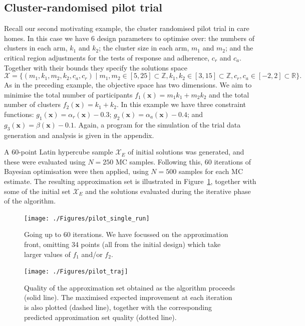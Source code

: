 \documentclass{article} %
\begin{document}
\subsection{Cluster-randomised pilot trial}

Recall our second motivating example, the cluster randomised pilot trial in care homes. In this case we have 6 design parameters to optimise over: the numbers of clusters in each arm, $k_{1}$ and $k_{2}$; the cluster size in each arm, $m_{1}$ and $m_{2}$; and the critical region adjustments for the tests of response and adherence, $c_{r}$ and $c_{a}$. Together with their bounds they specify the solutions space
\begin{equation}
\mathcal{X} = \{ (m_{1}, k_{1}, m_{2}, k_{2}, c_{a}, c_{r}) \mid m_{1}, m_{2} \in [5,25] \subset \mathbb{Z}, k_{1}, k_{2} \in [3,15] \subset \mathbb{Z}, c_{r}, c_{a} \in [-2,2] \subset \mathbb{R} \}.
\end{equation}
As in the preceding example, the objective space has two dimensions. We aim to minimise the total number of participants $f_{1}(\mathbf{x}) = m_{1}k_{1} + m_{2}k_{2}$ and the total number of clusters $f_{2}(\mathbf{x}) = k_{1} + k_{2}$. In this example we have three constraint functions: $g_{1}(\mathbf{x}) = \alpha_{r}(\mathbf{x}) - 0.3$; $g_{2}(\mathbf{x}) = \alpha_{a}(\mathbf{x}) - 0.4$; and $g_{3}(\mathbf{x}) = \beta(\mathbf{x}) - 0.1$. Again, a program for the simulation of the trial data generation and analysis is given in the appendix.

A 60-point Latin hypercube sample $\mathcal{X}_{E}$ of initial solutions was generated, and these were evaluated using $N = 250$ MC samples. Following this, 60 iterations of Bayesian optimisation were then applied, using $N = 500$ samples for each MC estimate. The resulting approximation set is illustrated in Figure~\ref{fig:pilot_single_run}, together with some of the initial set $\mathcal{X}_{E}$ and the solutions evaluated during the iterative phase of the algorithm.

\begin{figure}
\centering
\texttt{[image: ./Figures/pilot\_single\_run]}
\caption{Going up to 60 iterations. We have focussed on the approximation front, omitting 34 points (all from the initial design) which take larger values of $f_{1}$ and/or $f_{2}$. }
\label{fig:pilot_single_run}
\end{figure}

\begin{figure}
\centering
\texttt{[image: ./Figures/pilot\_traj]}
\caption{Quality of the approximation set obtained as the algorithm proceeds (solid line). The maximised expected improvement at each iteration is also plotted (dashed line), together with the corresponding predicted approximation set quality (dotted line).}
\label{fig:pilot_traj}
\end{figure}
\end{document}

